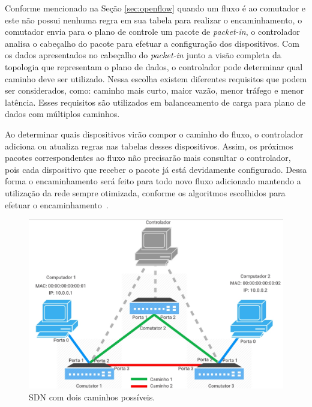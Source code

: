 Conforme mencionado na Seção \ref{sec:openflow} quando um fluxo é ao comutador e este não possui nenhuma regra em sua tabela para realizar o encaminhamento, o comutador envia para o plano de controle um pacote de \textit{packet-in}, o controlador analisa o cabeçalho do pacote para efetuar a configuração dos dispositivos. Com os dados apresentados no cabeçalho do \textit{packet-in} junto a visão completa da topologia que representam o plano de dados, o controlador pode determinar qual caminho deve ser utilizado. Nessa escolha existem diferentes requisitos que podem ser considerados, como: caminho mais curto, maior vazão, menor tráfego e menor latência. Esses requisitos são utilizados em balanceamento de carga para plano de dados com múltiplos caminhos.

Ao determinar quais dispositivos virão compor o caminho do fluxo, o controlador  adiciona ou atualiza regras nas tabelas desses dispositivos. Assim, os próximos pacotes correspondentes ao fluxo não precisarão mais consultar o controlador, pois cada dispositivo que receber o pacote já está devidamente configurado. Dessa forma o encaminhamento será feito para todo novo fluxo adicionado mantendo a utilização da rede sempre otimizada, conforme os algoritmos escolhidos para efetuar o encaminhamento~\cite{akyildiz2014roadmap}.


\begin{figure}[htb!]
	\caption{\label{fig:topo_explicacao} SDN com dois caminhos possíveis.} 
	\begin{center}
	    \includegraphics[scale=0.45]{imagens/topologia_explicacao.jpg}
	\end{center}
\end{figure}


